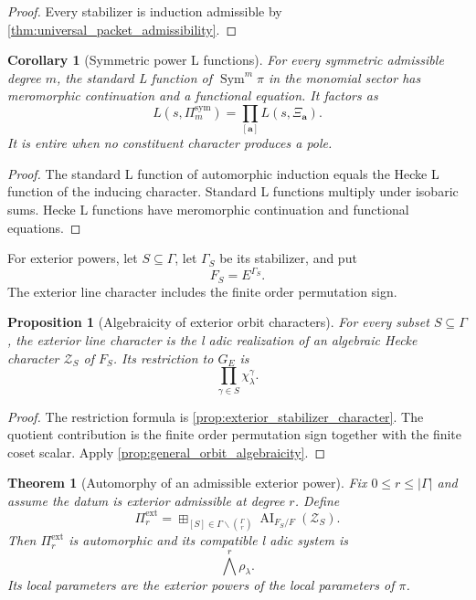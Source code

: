 \documentclass{aomart}
\newtheorem{theorem}{Theorem}[section]
\newtheorem{proposition}[proposition]{Proposition}
\newtheorem{corollary}[corollary]{Corollary}
\theoremstyle{definition}
\theoremstyle{remark}
\newcommand{\AI}{\operatorname{AI}}
\newcommand{\Sym}{\operatorname{Sym}}
\newcommand{\abs}[1]{\left\lvert#1\right\rvert}
\newcommand{\Zeta}{\mathcal Z}
\newcommand{\boxplusop}{\mathbin{\boxplus}}
\begin{document}
\begin{proof}
Every stabilizer is induction admissible by \cref{thm:universal_packet_admissibility}.
\end{proof}

\begin{corollary}[Symmetric power L functions]\label{cor:symmetric_L_functions}
For every symmetric admissible degree \(m\), the standard L function of \(\Sym^m\pi\) in the monomial sector has meromorphic continuation and a functional equation. It factors as
\[
\boxed{
L(s,\Pi_m^{\mathrm{sym}})
=
\prod_{[\bm a]}
L(s,\Xi_{\bm a}).
}
\]
It is entire when no constituent character produces a pole.
\end{corollary}

\begin{proof}
The standard L function of automorphic induction equals the Hecke L function of the inducing character. Standard L functions multiply under isobaric sums. Hecke L functions have meromorphic continuation and functional equations.
\end{proof}

For exterior powers, let \(S\subseteq\Gamma\), let \(\Gamma_S\) be its stabilizer, and put
\[
F_S=E^{\Gamma_S}.
\]
The exterior line character includes the finite order permutation sign.

\begin{proposition}[Algebraicity of exterior orbit characters]\label{prop:exterior_character_algebraic}
For every subset \(S\subseteq\Gamma\), the exterior line character is the l adic realization of an algebraic Hecke character \(\Zeta_S\) of \(F_S\). Its restriction to \(G_E\) is
\[
\boxed{
\prod_{\gamma\in S}\chi_\lambda^\gamma.
}
\]
\end{proposition}

\begin{proof}
The restriction formula is \cref{prop:exterior_stabilizer_character}. The quotient contribution is the finite order permutation sign together with the finite coset scalar. Apply \cref{prop:general_orbit_algebraicity}.
\end{proof}

\begin{theorem}[Automorphy of an admissible exterior power]\label{thm:global_exterior_automorphy}
Fix \(0\leq r\leq\abs\Gamma\) and assume the datum is exterior admissible at degree \(r\). Define
\[
\boxed{
\Pi_r^{\mathrm{ext}}
=
\boxplusop_{[S]\in\Gamma\backslash{\binom{\Gamma}{r}}}
\AI_{F_S/F}(\Zeta_S).
}
\]
Then \(\Pi_r^{\mathrm{ext}}\) is automorphic and its compatible l adic system is
\[
\boxed{
\bigwedge^r\rho_\lambda.
}
\]
Its local parameters are the exterior powers of the local parameters of \(\pi\).
\end{theorem}
\end{document}
